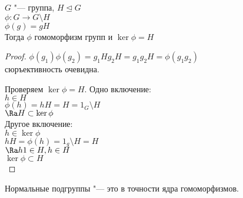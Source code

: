 \begin{theorem}
$G$ "--- группа, $H \unlhd G$\\
$\phi \colon G \to G \setminus H$\\
$\phi(g) = gH$ \\

Тогда $\phi$ гомоморфизм групп и  $\ker \phi = H$\\
\end{theorem}
\begin{proof}
$\phi(g_1)\phi(g_2) = g_1Hg_2H = g_1g_2H = \phi(g_1g_2)$\\
сюръективность очевидна. 

Проверяем $\ker \phi = H$.
Одно включение:\\
$h \in H$\\
$\phi(h) = hH =  H = 1_{G}\setminus H$\\
$\Ra H \subset \ker \phi$\\

Другое включение:\\
$h \in \ker \phi$\\
$hH = \phi(h) = 1_g\setminus H = H$ \\
$\Ra h1 \in H, h \in H$\\
$\ker \phi \subset H$\\

\end{proof}

\begin{conseq}
Нормальные подгруппы "--- это в точности ядра гомоморфизмов.
\end{conseq}